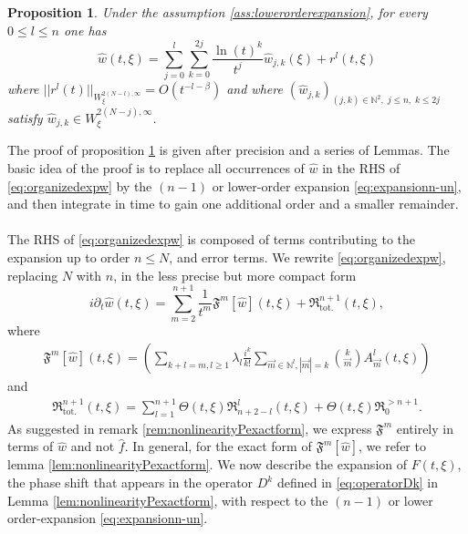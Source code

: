 \documentclass[a4paper, 15pt]{article}
\numberwithin{equation}{section}
\newtheorem{propal}[defi]{Proposition}
\begin{document}
\begin{propal}
\label{propal:mainofassympt}
Under the assumption \ref{ass:lowerorderexpansion}, for every $0\leq l\leq n$ one has
\begin{equation}
    \hat{w}(t,\xi)= \sum^{l}_{j=0}\sum^{2j}_{k=0}\frac{\ln(t)^k}{t^j}\hat{w}_{j,k}(\xi)+r^{l}(t,\xi)
\end{equation}
where $||r^l(t)||_{W^{2(N-l),\infty}_\xi}=O(t^{-l-\beta})$ and where $(\hat{w}_{j,k})_{(j,k)\in\mathbb{N}^{2},\;j\leq n,\;k\leq 2j}$ satisfy $\hat{w}_{j,k}\in W^{2(N-j),\infty}_\xi$. 
\end{propal}
The proof of proposition \ref{propal:mainofassympt} is given after precision and a series of Lemmas. The basic idea of the proof is to replace all occurrences of $ \hat{w}$ in the RHS of \eqref{eq:organizedexpw} by the $(n-1)$ or lower-order expansion \eqref{eq:expansionn-un}, and then integrate in time to gain one additional order and a smaller remainder.   \\\\
The RHS of \eqref{eq:organizedexpw} is composed of terms contributing to the expansion up to order $n\leq N$, and error terms. We rewrite \eqref{eq:organizedexpw}, replacing $N$ with $n$, in the less precise but more compact form 
\begin{equation}
\label{eq:organizedexpwcompact}
      i\partial_t\hat{w}(t,\xi)=\sum_{m=2}^{n+1}\frac{1}{t^m}\mathfrak{F}^m[\hat{w}](t,\xi)+\mathfrak{R}^{n+1}_{\text{tot.}}(t,\xi),
\end{equation}
where 
\begin{align}
\label{eq:Ffrakequation}
    \mathfrak{F}^m[\hat{w}](t,\xi)=(\sum_{k+l=m,l\geq1}\lambda_l\frac{i^k}{k!}\sum_{\overrightarrow{m}\in\mathbb{N}^l,|\overrightarrow{m}|=k}\binom{k}{\overrightarrow{m}}
A^l_{\overrightarrow{m}}(t,\xi))
\end{align}
and \begin{align}
    \mathfrak{R}^{n+1}_{\text{tot.}}(t,\xi)=\sum_{l=1}^{n+1}\Theta(t,\xi)\mathfrak{R}^l_{n+2-l}(t,\xi)+\Theta(t,\xi)\mathfrak{R}^{>n+1}_0.
\end{align}
 As suggested in remark \ref{rem:nonlinearityPexactform}, we express $\mathfrak{F}^m$ entirely in terms of $\hat{w}$ and not $\hat{f}$. In general, for the exact form of $\mathfrak{F}^m[\hat{w}]$, we refer to lemma \ref{lem:nonlinearityPexactform}. We now describe the expansion of $F(t,\xi)$, the phase shift that appears in the operator $D^k$ defined in \eqref{eq:operatorDk} in Lemma \ref{lem:nonlinearityPexactform}, with respect to the $(n-1)$ or lower order-expansion \eqref{eq:expansionn-un}.\\ 
\end{document}

